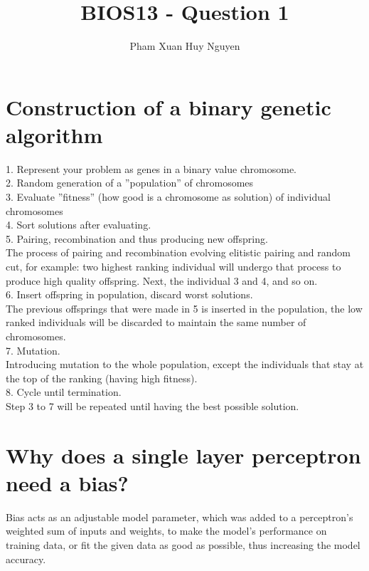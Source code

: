 \documentclass{article}
\title{BIOS13 - Question 1}
\author{Pham Xuan Huy Nguyen}
\begin{document}
\maketitle

\section{Construction of a binary genetic algorithm}
1. Represent your problem as genes in a binary value
chromosome.\\
2. Random generation of a ”population” of chromosomes\\
3. Evaluate ”fitness” (how good is a chromosome as solution) of individual chromosomes\\
4. Sort solutions after evaluating.\\
5. Pairing, recombination and thus producing new offspring.\\
The process of pairing and recombination evolving elitistic pairing and random cut, for example: two highest ranking individual will undergo that process to produce high quality offspring. Next, the individual 3 and 4, and so on. \\
6. Insert offspring in population, discard worst solutions.\\
The previous offsprings that were made in 5 is inserted in the population, the low ranked individuals will be discarded to maintain the same number of chromosomes.\\
7. Mutation.\\
Introducing mutation to the whole population, except the individuals that stay at the top of the ranking (having high fitness).\\
8. Cycle until termination.\\
Step 3 to 7 will be repeated until having the best possible solution.

\section{Why does a single layer perceptron need a bias?}

Bias acts as an adjustable model parameter, which was added to a perceptron's weighted sum of inputs and weights, to make the model’s performance on training data, or fit the given data as good as possible, thus increasing the model accuracy.
\end{document}
